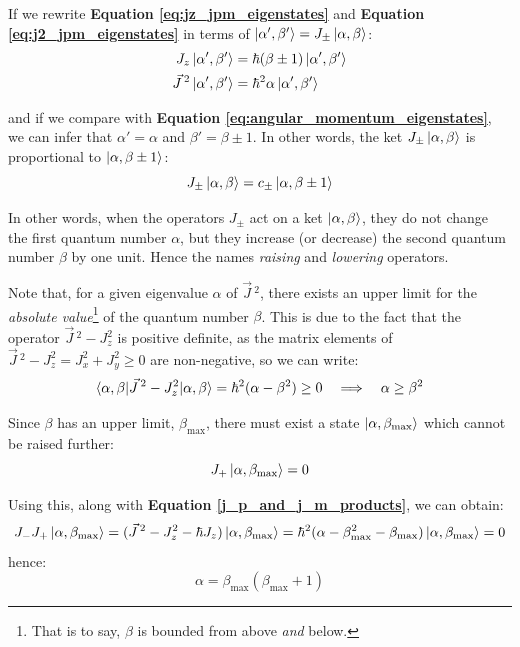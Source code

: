 If we rewrite \textbf{Equation \ref{eq:jz_jpm_eigenstates}} and \textbf{Equation \ref{eq:j2_jpm_eigenstates}} in terms of $\ket{\alpha',\beta'} = J_\pm \ket{\alpha,\beta}$:
\begin{equation}
    \begin{split}
        J_z\ket{\alpha', \beta'} &= \hbar(\beta \pm 1)\ket{\alpha', \beta'} \\
        \vec{J}\,^2\ket{\alpha', \beta'} &= \hbar^2\alpha\ket{\alpha', \beta'}
    \end{split}
\end{equation}

and if we compare with \textbf{Equation \ref{eq:angular_momentum_eigenstates}}, we can infer that $\alpha' = \alpha$ and $\beta' = \beta \pm 1$. In other words, the ket $J_\pm\ket{\alpha,\beta}$ is proportional to $\ket{\alpha, \beta\pm 1}$:
\begin{equation}
    J_\pm\ket{\alpha, \beta} = c_\pm\ket{\alpha, \beta\pm 1}
\end{equation}

In other words, when the operators $J_\pm$ act on a ket $\ket{\alpha, \beta}$, they do not change the first quantum number $\alpha$, but they increase (or decrease) the second quantum number $\beta$ by one unit. Hence the names \textit{raising} and \textit{lowering} operators.

Note that, for a given eigenvalue $\alpha$ of $\vec{J}\,^2$, there exists an upper limit for the \textit{absolute value}\footnote{That is to say, $\beta$ is bounded from above \textit{and} below.} of the quantum number $\beta$. This is due to the fact that the operator $\vec{J}\,^2 - J_z^2$ is positive definite, as the matrix elements of $\vec{J}\,^2 - J_z^2 = J_x^2 + J_y^2 \geq 0$ are non-negative, so we can write:
\begin{equation}
    \braket{\alpha, \beta| \vec{J}\,^2 - J_z^2 | \alpha, \beta} = \hbar^2(\alpha - \beta^2) \geq 0\quad \Longrightarrow\quad \alpha \geq\beta^2
\end{equation} 

Since $\beta$ has an upper limit, $\beta_\text{max}$, there must exist a state $\ket{\alpha, \beta_\text{max}}$ which cannot be raised further:
\begin{equation}
    J_+\ket{\alpha, \beta_\text{max}} = 0
\end{equation}

Using this, along with \textbf{Equation \ref{j_p_and_j_m_products}}, we can obtain:
\begin{equation}
    J_-J_+\ket{\alpha,\beta_\text{max}} = (\vec{J}\,^2 - J_z^2 - \hbar J_z)\ket{\alpha,\beta_\text{max}} = \hbar^2(\alpha-\beta_\text{max}^2 - \beta_\text{max})\ket{\alpha,\beta_\text{max}} = 0
\end{equation}
hence:
\begin{equation}
    \alpha = \beta_\text{max}(\beta_\text{max} + 1)
\end{equation}

